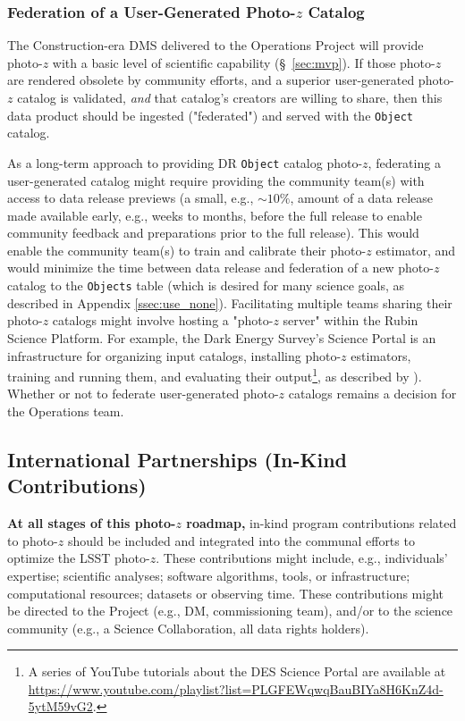 \documentclass[DM,lsstdraft,toc]{lsstdoc}
\begin{document}
\subsubsection{Federation of a User-Generated Photo-$z$ Catalog}\label{ssec:time_ops_ugfed}

The Construction-era DMS delivered to the Operations Project will provide photo-$z$ with a basic level of scientific capability (\S~\ref{sec:mvp}). 
If those photo-$z$ are rendered obsolete by community efforts, and a superior user-generated photo-$z$ catalog is validated, {\it and} that catalog's creators are willing to share, then this data product should be ingested ("federated") and served with the {\tt Object} catalog.

As a long-term approach to providing DR {\tt Object} catalog photo-$z$, federating a user-generated catalog might require providing the community team(s) with access to data release previews (a small, e.g., $\sim10\%$, amount of a data release made available early, e.g., weeks to months, before the full release to enable community feedback and preparations prior to the full release).
This would enable the community team(s) to train and calibrate their photo-$z$ estimator, and would minimize the time between data release and federation of a new photo-$z$ catalog to the {\tt Objects} table (which is desired for many science goals, as described in Appendix \ref{ssec:use_none}).
Facilitating multiple teams sharing their photo-$z$ catalogs might involve hosting a "photo-$z$ server" within the Rubin Science Platform.
For example, the Dark Energy Survey's Science Portal is an infrastructure for organizing input catalogs, installing photo-$z$ estimators, training and running them, and evaluating their output\footnote{A series of YouTube tutorials about the DES Science Portal are available at \url{https://www.youtube.com/playlist?list=PLGFEWqwqBauBIYa8H6KnZ4d-5ytM59vG2}.}, as described by \citet{2018A&C....25...58G}).
Whether or not to federate user-generated photo-$z$ catalogs remains a decision for the Operations team.

\subsection{International Partnerships (In-Kind Contributions)}\label{ssec:time_inkind}

{\bf At all stages of this photo-$z$ roadmap,} in-kind program contributions related to photo-$z$ should be included and integrated into the communal efforts to optimize the LSST photo-$z$. 
These contributions might include, e.g., individuals' expertise; scientific analyses; software algorithms, tools, or infrastructure; computational resources; datasets or observing time.
These contributions might be directed to the Project (e.g., DM, commissioning team), and/or to the science community (e.g., a Science Collaboration, all data rights holders). 
\end{document}
